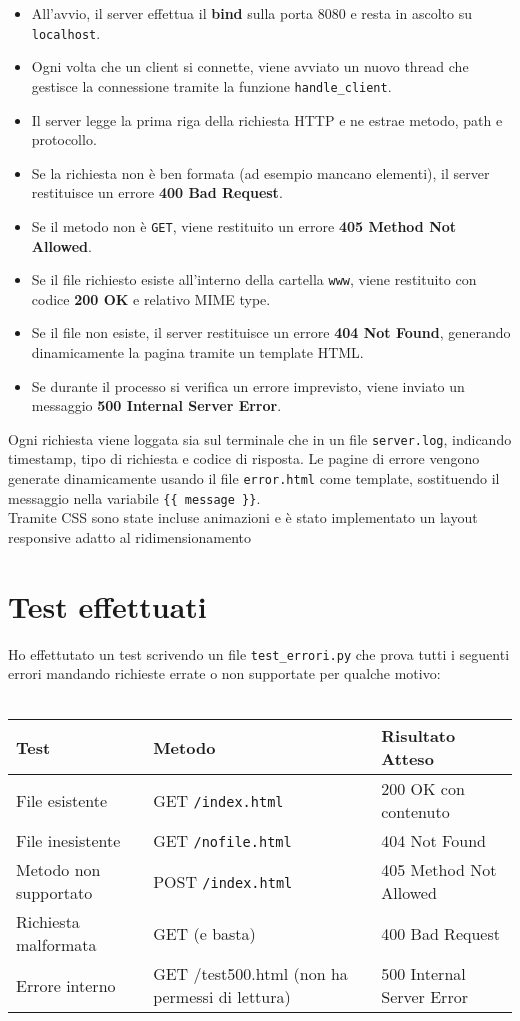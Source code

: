 \documentclass[a4paper,11pt]{article}
\begin{document}
\begin{itemize}
  \item All'avvio, il server effettua il \textbf{bind} sulla porta 8080 e resta in ascolto su \texttt{localhost}.
  \item Ogni volta che un client si connette, viene avviato un nuovo thread che gestisce la connessione tramite la funzione \texttt{handle\_client}.
  \item Il server legge la prima riga della richiesta HTTP e ne estrae metodo, path e protocollo.
  \item Se la richiesta non è ben formata (ad esempio mancano elementi), il server restituisce un errore \textbf{400 Bad Request}.
  \item Se il metodo non è \texttt{GET}, viene restituito un errore \textbf{405 Method Not Allowed}.
  \item Se il file richiesto esiste all'interno della cartella \texttt{www}, viene restituito con codice \textbf{200 OK} e relativo MIME type.
  \item Se il file non esiste, il server restituisce un errore \textbf{404 Not Found}, generando dinamicamente la pagina tramite un template HTML.
  \item Se durante il processo si verifica un errore imprevisto, viene inviato un messaggio \textbf{500 Internal Server Error}.
\end{itemize}

Ogni richiesta viene loggata sia sul terminale che in un file \texttt{server.log}, indicando timestamp, tipo di richiesta e codice di risposta. Le pagine di errore vengono generate dinamicamente usando il file \texttt{error.html} come template, sostituendo il messaggio nella variabile \texttt{\{\{ message \}\}}.
\\Tramite CSS sono state incluse animazioni e è stato implementato un layout responsive adatto al ridimensionamento


\section*{Test effettuati}
Ho effettutato un test scrivendo un file \texttt{test\_errori.py} che prova tutti i seguenti errori mandando richieste errate o non supportate per qualche motivo:\\\\
\begin{tabular}{@{}lll@{}}
\toprule
\textbf{Test} & \textbf{Metodo} & \textbf{Risultato Atteso} \\
\midrule
File esistente & GET \texttt{/index.html} & 200 OK con contenuto \\
File inesistente & GET \texttt{/nofile.html} & 404 Not Found \\
Metodo non supportato & POST \texttt{/index.html} & 405 Method Not Allowed \\
Richiesta malformata & GET (e basta) & 400 Bad Request \\
Errore interno & GET /test500.html (non ha permessi di lettura) & 500 Internal Server Error \\
\bottomrule
\end{tabular}
\end{document}

